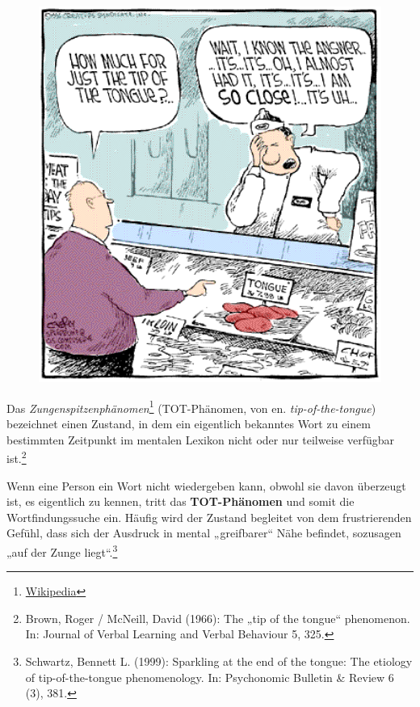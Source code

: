 \documentclass[
  letterpaper,
]{scrbook}
\begin{document}
\begin{figure}

{\centering 

\href{https://web.colby.edu/cogblog/tag/tip-of-the-tongue/}{\includegraphics[width=1\textwidth,height=\textheight]{./pictures/tip-of-the-tongue1-1.png}}

}

\end{figure}

Das \emph{Zungenspitzenphänomen}\footnote{\href{https://de.wikipedia.org/wiki/Zungenspitzenph\%C3\%A4nomen}{Wikipedia}}
(TOT-Phänomen, von en. \emph{tip-of-the-tongue}) bezeichnet einen
Zustand, in dem ein eigentlich bekanntes Wort zu einem bestimmten
Zeitpunkt im mentalen Lexikon nicht oder nur teilweise verfügbar
ist.\footnote{Brown, Roger / McNeill, David (1966): The „tip of the
  tongue`` phenomenon. In: Journal of Verbal Learning and Verbal
  Behaviour 5, 325.}

Wenn eine Person ein Wort nicht wiedergeben kann, obwohl sie davon
überzeugt ist, es eigentlich zu kennen, tritt das \textbf{TOT-Phänomen}
und somit die Wortfindungssuche ein. Häufig wird der Zustand begleitet
von dem frustrierenden Gefühl, dass sich der Ausdruck in mental
„greifbarer`` Nähe befindet, sozusagen „auf der Zunge
liegt``.\footnote{Schwartz, Bennett L. (1999): Sparkling at the end of
  the tongue: The etiology of tip-of-the-tongue phenomenology. In:
  Psychonomic Bulletin \& Review 6 (3), 381.}
\end{document}
